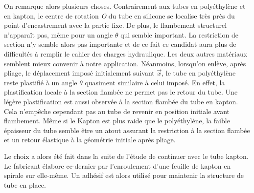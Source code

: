 \begin{table}[!htbp]
	\centering
	\captionsetup{justification=centering}
	\caption{Paramètres tubes testés \cite{Ashby1998,Jaboviste2018}}
	\label{tab:parametres_tubes_tests_qualitatifs}
\end{table}

On remarque alors plusieurs choses. Contrairement aux tubes en polyéthylène et en kapton, le centre de rotation \emph{O} du tube en silicone se localise très près du point d'encastrement avec la partie fixe. De plus, le flambement structurel n’apparaît pas, même pour un angle $\theta$ qui semble important. La restriction de section n'y semble alors pas importante et de ce fait ce candidat aura plus de difficultés à remplir le cahier des charges hydraulique. Les deux autres matériaux semblent mieux convenir à notre application. Néanmoins, lorsqu'on enlève, après pliage, le déplacement imposé initialement suivant $\vec{x}$, le tube en polyéthylène reste plastifié à un angle $\theta$ quasiment similaire à celui imposé. En effet, la plastification locale à la section flambée ne permet pas le retour du tube. Une légère plastification est aussi observée à la section flambée du tube en kapton. Cela n'empêche cependant pas au tube de revenir en position initiale avant flambement. Même si le Kapton est plus raide que le polyéthylène, la faible épaisseur du tube semble être un atout assurant la restriction à la section flambée et un retour élastique à la géométrie initiale après pliage.

Le choix a alors été fait dans la suite de l'étude de continuer avec le tube kapton. Le fabricant élabore ce-dernier par l'enroulement d'une feuille de kapton en spirale sur elle-même. Un adhésif est alors utilisé pour maintenir la structure de tube en place.
